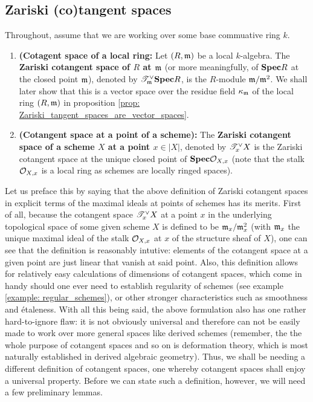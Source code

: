         \subsection{Zariski (co)tangent spaces}
            \begin{definition} \label{def: zariski_tangent_spaces} 
                Throughout, assume that we are working over some base commuative ring $k$. 
                \begin{enumerate}
                    \item \textbf{(Cotagent space of a local ring:} Let $(R, \mathfrak{m})$ be a local $k$-algebra. The \textbf{Zariski cotangent space of $R$ at $\mathfrak{m}$} (or more meaningfully, of $\mathbf{Spec} R$ at the closed point $\mathfrak{m}$), denoted by $\mathscr{T}^{\vee}_{\mathfrak{m}}\mathbf{Spec} R$, is the $R$-module $\mathfrak{m}/\mathfrak{m}^2$. We shall later show that this is a vector space over the residue field $\kappa_{\mathfrak{m}}$ of the local ring $(R, \mathfrak{m})$ in proposition \ref{prop: Zariski_tangent_spaces_are_vector_spaces}.   
                    \item \textbf{(Cotangent space at a point of a scheme):} The \textbf{Zariski cotangent space of a scheme $X$ at a point $x \in |X|$}, denoted by $\mathscr{T}^{\vee}_xX$ is the Zariski cotangent space at the unique closed point of $\mathbf{Spec} \mathcal{O}_{X, x}$ (note that the stalk $\mathcal{O}_{X, x}$ is a local ring as schemes are locally ringed spaces).
                \end{enumerate}
            \end{definition}
            \begin{remark}
                Let us preface this by saying that the above definition of Zariski cotangent spaces in explicit terms of the maximal ideals at points of schemes has its merits. First of all, because the cotangent space $\mathscr{T}^{\vee}_xX$ at a point $x$ in the underlying topological space of some given scheme $X$ is defined to be $\mathfrak{m}_x/\mathfrak{m}_x^2$ (with $\mathfrak{m}_x$ the unique maximal ideal of the stalk $\mathcal{O}_{X, x}$ at $x$ of the structure sheaf of $X$), one can see that the definition is reasonably intutive: elements of the cotangent space at a given point are just linear  that vanish at said point. Also, this definition allows for relatively easy calculations of dimensions of cotangent spaces, which come in handy should one ever need to establish regularity of schemes (see example \ref{example: regular_schemes}), or other stronger characteristics such as smoothness and \'etaleness. With all this being said, the above formulation also has one rather hard-to-ignore flaw: it is not obviously universal and therefore can not be easily made to work over more general spaces like derived schemes (remember, the the whole purpose of cotangent spaces and so on is deformation theory, which is most naturally established in derived algebraic geometry). Thus, we shall be needing a different definition of cotangent spaces, one whereby cotangent spaces shall enjoy a universal property. Before we can state such a definition, however, we will need a few preliminary lemmas.
            \end{remark}
            
